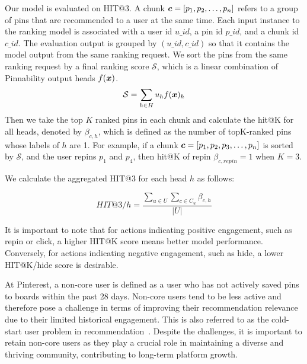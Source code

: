 Our model is evaluated on HIT@3.
A chunk $\boldsymbol{c} = [p_1, p_2, \dots, p_n]$ refers to a group of pins that are recommended to a user at the same time. 
Each input instance to the ranking model is associated with a user id $u\_{id}$, a pin id $p\_{id}$, and a chunk id $c\_{id}$. 
The evaluation output is grouped by $(u\_{id}, c\_{id})$ so that it contains the model output from the same ranking request. We sort the pins from the same ranking request by a final ranking score $\mathcal{S}$, which is a linear combination of Pinnability output heads $f(\boldsymbol{x})$. 
\begin{equation}
\mathcal{S} = \sum_{h \in H } u_h f(\boldsymbol{x})_h
\end{equation}
Then we take the top $K$ ranked pins in each chunk and calculate the hit@K for all heads, denoted by $\beta_{c,h}$, which is defined as the number of topK-ranked pins whose labels of $h$ are 1. For example, if a chunk $\boldsymbol{c} = [p_1, p_2, p_3,\dots , p_n]$ is sorted by $\mathcal{S}$, and the user repins $p_1$ and $p_4$, then hit@K of repin $\beta_{c,repin}=1$ when $K=3$. 

We calculate the aggregated HIT@3  for each head $h$ as follows:


\begin{equation}
HIT@3/h = \frac{\sum_{u \in U }\sum_{c \in C_u } \beta_{c,h}}{\left| U \right|}
\end{equation}

It is important to note that for actions indicating positive engagement, such as repin or click, a higher HIT@K score means better model performance. Conversely, for actions indicating negative engagement, such as hide, a lower HIT@K/hide score is desirable.


At Pinterest, a non-core user is defined as a user who has not actively saved pins to boards within the past 28 days.
Non-core users tend to be less active and therefore pose a challenge in terms of improving their recommendation relevance due to their limited historical engagement. This is also referred to as the cold-start user problem in recommendation~\cite{natarajan2020resolving}. Despite the challenges, it is important to retain non-core users as they play a crucial role in maintaining a diverse and thriving community, contributing to long-term platform growth.

